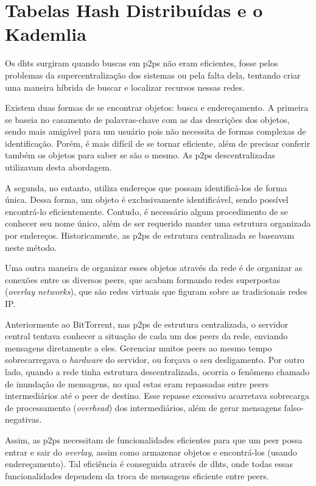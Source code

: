 
\newpage
\section{Tabelas Hash Distribuídas e o Kademlia}

Os \glspl{dht} surgiram quando buscas em \glspl{p2p} não eram eficientes, fosse pelos
problemas da supercentralização dos sistemas ou pela falta dela, tentando criar uma
maneira híbrida de buscar e localizar recursos nessas redes.

Existem duas formas de se encontrar objetos: busca e endereçamento. A primeira se baseia
no casamento de palavras-chave com as das descrições dos objetos, sendo mais amigável
para um usuário pois não necessita de formas complexas de identificação. Porém, é mais
difícil de se tornar eficiente, além de precisar conferir também os objetos para saber
se são o mesmo. As \glspl*{p2p} descentralizadas utilizavam desta abordagem.

A segunda, no entanto, utiliza endereços que possam identificá-los de forma única. Dessa
forma, um objeto é exclusivamente identificável, sendo possível encontrá-lo
eficientemente. Contudo, é necessário algum procedimento de se conhecer seu nome único,
além de ser requerido manter uma estrutura organizada por endereços. Historicamente, as
\glspl*{p2p} de estrutura centralizada se baseavam neste método.

Uma outra maneira de organizar esses objetos através da rede é de organizar as conexões
entre os diversos \glspl*{peer}, que acabam formando redes superpostas (\emph{overlay
networks}), que são redes virtuais que figuram sobre as tradicionais redes IP.

Anteriormente ao BitTorrent, nas \glspl*{p2p} de estrutura centralizada, o servidor
central tentava conhecer a situação de cada um dos \glspl*{peer} da rede, enviando
mensagens diretamente a eles. Gerenciar muitos \glspl*{peer} ao mesmo tempo
sobrecarregava o \emph{hardware} do servidor, ou forçava o seu desligamento. Por outro
lado, quando a rede tinha estrutura descentralizada, ocorria o fenômeno chamado de
inundação de mensagens, no qual estas eram repassadas entre \glspl*{peer}
intermediários até o \gls*{peer} de destino. Esse repasse excessivo acarretava
sobrecarga de processamento (\emph{overhead}) dos intermediários, além de gerar
mensagens falso-negativas.

Assim, as \glspl*{p2p} necessitam de funcionalidades eficientes para que um \gls*{peer}
possa entrar e sair do \emph{overlay}, assim como armazenar objetos e encontrá-los
(usando endereçamento). Tal eficiência é conseguida através de \glspl{dht}, onde todas
essas funcionalidades dependem da troca de mensagens eficiente entre \glspl*{peer}.

